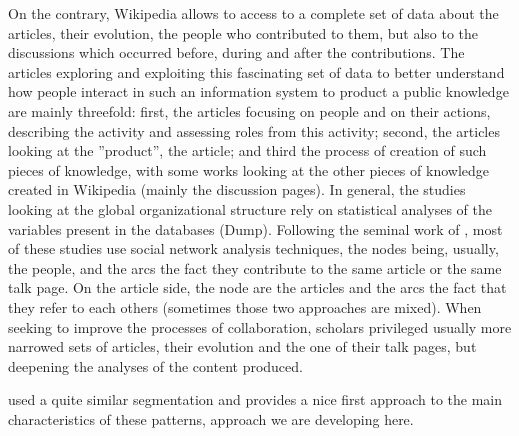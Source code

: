On the contrary, Wikipedia allows to access to a complete set of data
about the articles, their evolution, the people who contributed to
them, but also to the discussions which occurred before, during and
after the contributions. The articles exploring and exploiting this
fascinating set of data to better understand how people interact in
such an information system to product a public knowledge are mainly
threefold: first, the articles focusing on people and on their actions,
describing the activity and assessing roles from this activity; second,
the articles looking at the ''product'', the article; and third
the process of creation of such pieces of knowledge, with some works
looking at the other pieces of knowledge created in Wikipedia (mainly
the discussion pages). In general, the studies looking at the global
organizational structure rely on statistical analyses of the variables
present in the databases (Dump). Following the seminal work of \citet{KorfiatisPoulosBokos06},
most of these studies use social network analysis techniques, the
nodes being, usually, the people, and the arcs the fact they contribute
to the same article or the same talk page. On the article side, the
node are the articles and the arcs the fact that they refer to each
others (sometimes those two approaches are mixed). When seeking to
improve the processes of collaboration, scholars privileged usually
more narrowed sets of articles, their evolution and the one of their
talk pages, but deepening the analyses of the content produced.

\citet{Slattery09} used a quite similar segmentation and provides
a nice first approach to the main characteristics of these patterns,
approach we are developing here.
